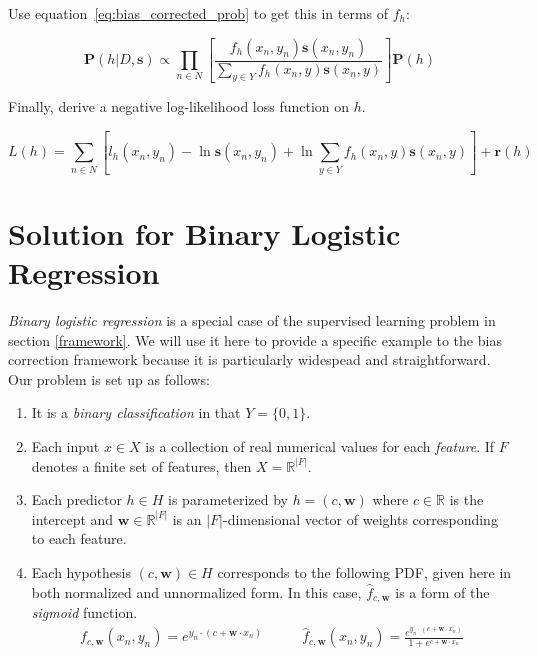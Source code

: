 \documentclass[twoside]{article}
\begin{document}
Use equation~\eqref{eq:bias_corrected_prob} to get this in terms of \(f_h\):

\[\mathbf{P}(h|D,\mathbf{s})\propto\prod_{n \in N} \left[\frac{f_h(x_n,y_n)\mathbf{s}(x_n,y_n)}{\sum_{y \in Y}f_h(x_n,y)\mathbf{s}(x_n,y)}\right]\mathbf{P}(h)\]

Finally, derive a negative log-likelihood loss function on \(h\).

\begin{equation}
\label{eq:bias_corrected_loss_function}
L(h)= \sum_{n \in N} \left[l_h(x_n,y_n)-\ln\mathbf{s}(x_n,y_n)+\ln\sum_{y \in Y}f_h(x_n,y)\mathbf{s}(x_n,y) \right] +\mathbf{r}(h)
\end{equation}

\pagebreak

\section{Solution for Binary Logistic Regression}
\label{section:logistic}

\textit{Binary logistic regression} is a special case of the supervised learning problem in section \ref{framework}. We will use it here to provide a specific example to the bias correction framework because it is particularly widespead and straightforward. Our problem is set up as follows:

\begin{enumerate}
	\item It is a \textit{binary classification} in that \(Y = \{0, 1\}\).
	\item Each input \(x \in X\) is a collection of real numerical values for each \textit{feature}. If \(F\) denotes a finite set of features, then \(X = \mathbb{R} ^{|F|}\).
	\item Each predictor \(h \in H\) is parameterized by \(h = (c, \mathbf{w})\) where \(c \in \mathbb{R}\) is the intercept and \(\mathbf{w} \in \mathbb{R}^{|F|}\) is an \(|F|\)-dimensional vector of weights corresponding to each feature.
          \item Each hypothesis \((c, \mathbf{w}) \in H\) corresponds to the following PDF, given here in both normalized and unnormalized form. In this case, \(\hat{f}_{c,\mathbf{w}}\) is a form of the \textit{sigmoid} function.
          \begin{align}
	   \label{eq:logistic_original_sigmoid}
          f_{c,\mathbf{w}}(x_n, y_n)=e^{y_n \cdot (c+\mathbf{w} \cdot x_n)} &
          \qquad\hat{f}_{c,\mathbf{w}}(x_n, y_n)=\frac{e^{y_n \cdot (c+\mathbf{w} \cdot x_n)}}{1+e^{c+\mathbf{w} \cdot x_n}}
         \end{align}
\end{enumerate}
\end{document}
